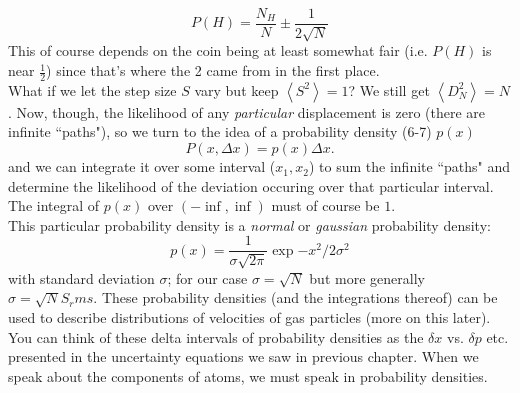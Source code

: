 \documentclass[10pt,letterpaper]{article}
\begin{document}
$$ P(H) = \frac{N_H}{N} \pm \frac{1}{2\sqrt{N}} $$ 
This of course depends on the coin being at least somewhat fair (i.e. $P(H)$ is near $\frac{1}{2}$) since that's where the 2 came from in the first place. \\
\indent What if we let the step size $S$ vary but keep $\left<S^2\right> = 1$? We still get $\left<D^2_N\right> = N$. Now, though, the likelihood of any \textit{particular} displacement is zero (there are infinite ``paths"), so we turn to the idea of a probability density (6-7) $p(x)$
$$P(x, \Delta x) = p(x) \Delta x. $$ 
and we can integrate it over some interval ($x_1, x_2$) to sum the infinite ``paths" and determine the likelihood of the deviation occuring over that particular interval. The integral of $p(x)$ over $(-\inf, \inf)$ must of course be $1$. \\
\indent This particular probability density is a \textit{normal} or \textit{gaussian} probability density:
$$ p(x) = \frac{1}{\sigma\sqrt{2\pi}}\exp{-x^2/2\sigma^2} $$ with standard deviation $\sigma$; for our case $\sigma = \sqrt{N}$ but more generally $\sigma = \sqrt{N}S_rms$. 
These probability densities (and the integrations thereof) can be used to describe distributions of velocities of gas particles (more on this later). You can think of these delta intervals of probability densities as the $\delta x$ vs. $\delta p$ etc. presented in the uncertainty equations we saw in previous chapter. When we speak about the components of atoms, we must speak in probability densities. 
\end{document}
